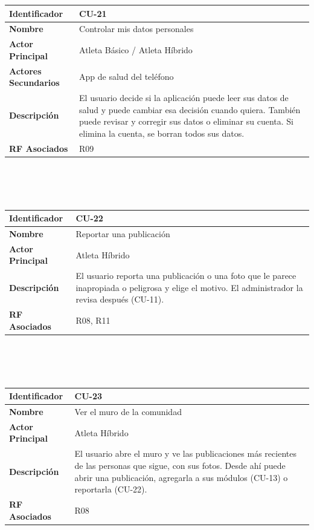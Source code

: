 \newpage
\begin{tabular}{|p{3.5cm}|p{11.5cm}|}
    \hline
    \rowcolor[HTML]{EFEFEF}
    \textbf{Identificador} & \textbf{CU-21} \\ \hline
    \textbf{Nombre} & Controlar mis datos personales \\ \hline
    \textbf{Actor Principal} & Atleta Básico / Atleta Híbrido \\ \hline
    \textbf{Actores Secundarios} & App de salud del teléfono \\ \hline
    \textbf{Descripción} & El usuario decide si la aplicación puede leer sus datos de salud y puede cambiar esa decisión cuando quiera. También puede revisar y corregir sus datos o eliminar su cuenta. Si elimina la cuenta, se borran todos sus datos. \\ \hline
    \textbf{RF Asociados} & R09 \\ \hline
\end{tabular}
\\\\\\
\begin{tabular}{|p{3.5cm}|p{11.5cm}|}
    \hline
    \rowcolor[HTML]{EFEFEF}
    \textbf{Identificador} & \textbf{CU-22} \\ \hline
    \textbf{Nombre} & Reportar una publicación \\ \hline
    \textbf{Actor Principal} & Atleta Híbrido \\ \hline
    \textbf{Descripción} & El usuario reporta una publicación o una foto que le parece inapropiada o peligrosa y elige el motivo. El administrador la revisa después (CU-11). \\ \hline
    \textbf{RF Asociados} & R08, R11 \\ \hline
\end{tabular}
\\\\\\
\begin{tabular}{|p{3.5cm}|p{11.5cm}|}
    \hline
    \rowcolor[HTML]{EFEFEF}
    \textbf{Identificador} & \textbf{CU-23} \\ \hline
    \textbf{Nombre} & Ver el muro de la comunidad \\ \hline
    \textbf{Actor Principal} & Atleta Híbrido \\ \hline
    \textbf{Descripción} & El usuario abre el muro y ve las publicaciones más recientes de las personas que sigue, con sus fotos. Desde ahí puede abrir una publicación, agregarla a sus módulos (CU-13) o reportarla (CU-22). \\ \hline
    \textbf{RF Asociados} & R08 \\ \hline
\end{tabular}
